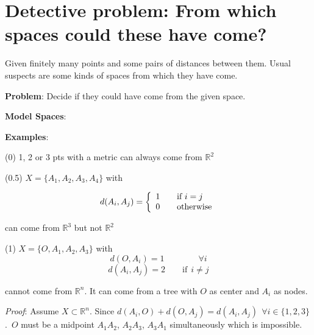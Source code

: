\section{Detective problem: From which spaces could these have come?}

Given finitely many points and some pairs of distances between them. Usual suspects
are some kinds of spaces from which they have come.

\vspace{0.15in}

\textbf{Problem}: Decide if they could have come from the given space.

\vspace{0.1in}

\noindent \textbf{Model Spaces}:

\vspace{0.4in}

\noindent \textbf{Examples}:

\vspace{0.1in}

(0) 1, 2 or 3 pts with a metric can always come from $\mathbb{R}^2$

\vspace{0.08in}

(0.5) $X = \{A_1, A_2, A_3, A_4\}$ with

\[ d(A_i, A_j) = \left\{
  \begin{array}{l l}
    1 & \quad \text{if $i=j$}\\
    0 & \quad \text{otherwise}
  \end{array} \right.\]

\qquad can come from $\mathbb{R}^3$ but not $\mathbb{R}^2$

\vspace{0.08in}

(1) $X = \{O, A_1, A_2, A_3\}$ with
    $$d(O, A_i) = 1 \qquad \qquad \forall i$$
    $$d(A_i, A_j) = 2 \qquad \text{if}\ \ i\neq j$$

\qquad cannot come from $\mathbb{R}^n$. It can come from a
tree with $O$ as center and $A_i$ as nodes.

\vspace{0.1in}

\textit{Proof}: Assume $X \subset \mathbb{R}^n$. Since $d(A_i, O) + d(O, A_j)= d(A_i, A_j)\ \
\forall i \in \{1, 2, 3\}$.\ $O$ must be a midpoint $A_1A_2$, $A_2A_3$, $A_3A_1$
simultaneously which is impossible.

\vspace{0.2in}

